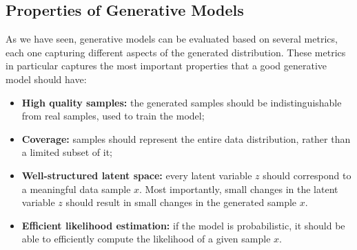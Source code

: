 \subsection{Properties of Generative Models}
As we have seen, generative models can be evaluated based on several metrics, each one capturing different aspects of the generated distribution.
These metrics in particular captures the most important properties that a good generative model should have:
\begin{itemize}
    \item \textbf{High quality samples:} the generated samples should be indistinguishable from real samples, used to train the model;
    \item \textbf{Coverage:} samples should represent the entire data distribution, rather than a limited subset of it;
    \item \textbf{Well-structured latent space:} every latent variable $z$ should correspond to a meaningful data sample $x$. 
    Most importantly, small changes in the latent variable $z$ should result in small changes in the generated sample $x$.
    \item \textbf{Efficient likelihood estimation:} if the model is probabilistic, it should be able to efficiently compute the likelihood of a given sample $x$.
\end{itemize}
